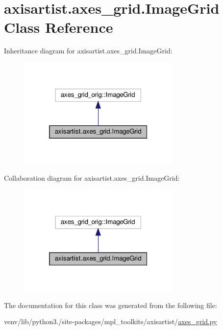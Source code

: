 \hypertarget{classaxisartist_1_1axes__grid_1_1ImageGrid}{}\section{axisartist.\+axes\+\_\+grid.\+Image\+Grid Class Reference}
\label{classaxisartist_1_1axes__grid_1_1ImageGrid}


Inheritance diagram for axisartist.\+axes\+\_\+grid.\+Image\+Grid\+:
\nopagebreak
\begin{figure}[H]
\begin{center}
\leavevmode
\includegraphics[width=229pt]{classaxisartist_1_1axes__grid_1_1ImageGrid__inherit__graph}
\end{center}
\end{figure}


Collaboration diagram for axisartist.\+axes\+\_\+grid.\+Image\+Grid\+:
\nopagebreak
\begin{figure}[H]
\begin{center}
\leavevmode
\includegraphics[width=229pt]{classaxisartist_1_1axes__grid_1_1ImageGrid__coll__graph}
\end{center}
\end{figure}


The documentation for this class was generated from the following file\+:\begin{DoxyCompactItemize}
\item 
venv/lib/python3./site-\/packages/mpl\+\_\+toolkits/axisartist/\hyperlink{axisartist_2axes__grid_8py}{axes\+\_\+grid.\+py}\end{DoxyCompactItemize}
